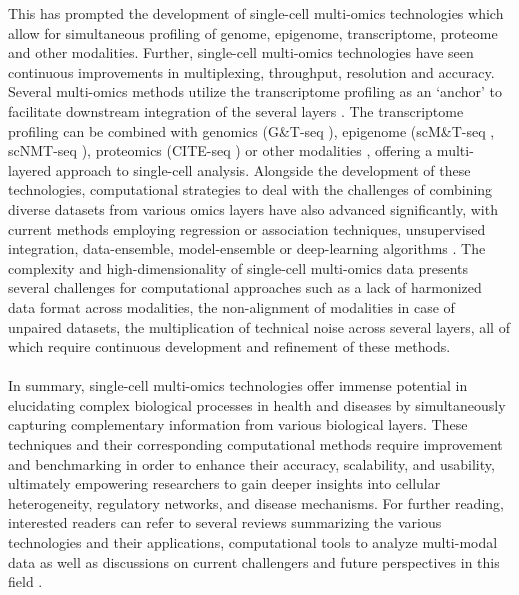 This has prompted the development of single-cell multi-omics technologies which allow for simultaneous profiling of genome, epigenome, transcriptome, proteome and other modalities. Further, single-cell multi-omics technologies have seen continuous improvements in multiplexing, throughput, resolution and accuracy. Several multi-omics methods utilize the transcriptome profiling as an ‘anchor’ to facilitate downstream integration of the several layers \textbf{\cite{baysoy_technological_2023}}. The transcriptome profiling can be combined with genomics (G\&T-seq \textbf{\cite{macaulay_gt-seq_2015}}), epigenome (scM\&T-seq \textbf{\cite{angermueller_parallel_2016}}, scNMT-seq \textbf{\cite{clark_scnmt-seq_2018}}), proteomics (CITE-seq \textbf{\cite{stoeckius_simultaneous_2017}}) or other modalities \textbf{\cite{dixit_perturb-seq_2016,singh_high-throughput_2019}}, offering a multi-layered approach to single-cell analysis. Alongside the development of these technologies, computational strategies to deal with the challenges of combining diverse datasets from various omics layers have also advanced significantly, with current methods employing regression or association techniques, unsupervised integration, data-ensemble, model-ensemble \textbf{\cite{vahabi_unsupervised_2022, stanojevic_computational_2022}} or deep-learning algorithms \textbf{\cite{baysoy_technological_2023,athaya_multimodal_2023}}. The complexity and high-dimensionality of single-cell multi-omics data presents several challenges for computational approaches such as a lack of harmonized data format across modalities, the non-alignment of modalities in case of unpaired datasets, the multiplication of technical noise across several layers, all of which require continuous development and refinement of these methods.
\\\\
In summary, single-cell multi-omics technologies offer immense potential in elucidating complex biological processes in health and diseases by simultaneously capturing complementary information from various biological layers. These techniques and their corresponding computational methods require improvement and benchmarking in order to enhance their accuracy, scalability, and usability, ultimately empowering researchers to gain deeper insights into cellular heterogeneity, regulatory networks, and disease mechanisms. For further reading, interested readers can refer to several reviews summarizing the various technologies and their applications, computational tools to analyze multi-modal data as well as discussions on current challengers and future perspectives in this field \textbf{\cite{flynn_single-cell_2023,lee_single-cell_2020,baysoy_technological_2023, miao_multi-omics_2021, dimitriu_single-cell_2022}}.
